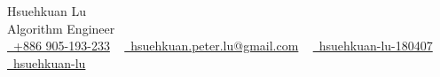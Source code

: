 \begin{center}
		{\HUGE Hsuehkuan Lu} \\ %
		\vspace{0.1cm}
		{\color{UI_blue} \Large{Algorithm Engineer}} \\
		\href{tel:+886905193233}{\faPhone\ +886 905-193-233} ~
		\href{mailto:hsuehkuan.peter.lu@gmail.com}{\faEnvelope\ hsuehkuan.peter.lu@gmail.com} ~
		\href{https://www.linkedin.com/in/hsuehkuan-lu-180407/}{\faLinkedinSquare\ hsuehkuan-lu-180407} ~
		\href{https://github.com/hsuehkuan-lu}{\faGithub\ hsuehkuan-lu}
\end{center}